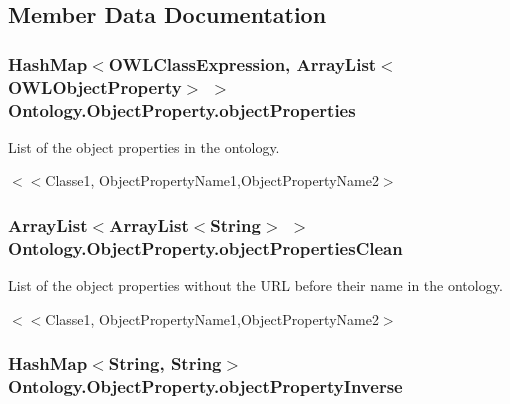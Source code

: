 \subsection{Member Data Documentation}
\hypertarget{class_ontology_1_1_object_property_a887a6b686410445bba4c74fa0b650168}{
\subsubsection[{objectProperties}]{\setlength{\rightskip}{0pt plus 5cm}HashMap$<$OWLClassExpression, ArrayList$<$OWLObjectProperty$>$ $>$ {\bf Ontology.ObjectProperty.objectProperties}}}
\label{class_ontology_1_1_object_property_a887a6b686410445bba4c74fa0b650168}


List of the object properties in the ontology. 

$<$$<$Classe1, ObjectPropertyName1,ObjectPropertyName2$>$ \hypertarget{class_ontology_1_1_object_property_afed9e7e803a7a9a541d1057936b2edaf}{
\subsubsection[{objectPropertiesClean}]{\setlength{\rightskip}{0pt plus 5cm}ArrayList$<$ArrayList$<$String$>$ $>$ {\bf Ontology.ObjectProperty.objectPropertiesClean}}}
\label{class_ontology_1_1_object_property_afed9e7e803a7a9a541d1057936b2edaf}


List of the object properties without the URL before their name in the ontology. 

$<$$<$Classe1, ObjectPropertyName1,ObjectPropertyName2$>$ \hypertarget{class_ontology_1_1_object_property_a363cd9e611554fbad7c3efbc48621715}{
\subsubsection[{objectPropertyInverse}]{\setlength{\rightskip}{0pt plus 5cm}HashMap$<$String, String$>$ {\bf Ontology.ObjectProperty.objectPropertyInverse}}}
\label{class_ontology_1_1_object_property_a363cd9e611554fbad7c3efbc48621715}


